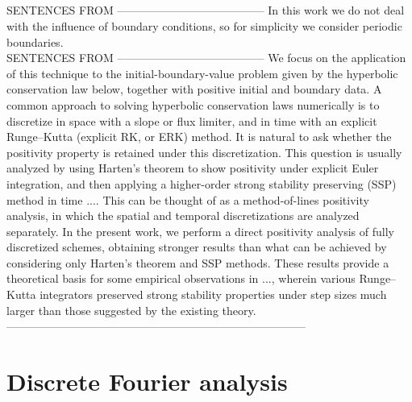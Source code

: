 \documentclass[a4paper]{article}
\begin{document}
\subsection{}
SENTENCES FROM \cite{posconv}---------------------------------------
In this work we do not deal with the influence of boundary conditions, so for simplicity
we consider periodic boundaries.\\
SENTENCES FROM \cite{posconv}---------------------------------------
We focus on the application of this technique to the initial-boundary-value problem given
by the hyperbolic conservation law below, together with positive initial and boundary data.
A common approach to solving hyperbolic conservation laws numerically is to discretize in
space with a slope or flux limiter, and in time with an explicit Runge--Kutta (explicit RK,
or ERK) method. It is natural to ask whether the positivity property is retained under this
discretization. This question is usually analyzed by using Harten's theorem
to show positivity under explicit Euler integration, and then applying a higher-order strong
stability preserving (SSP) method in time .... This can be thought of as a method-of-lines
positivity analysis, in which the spatial and temporal discretizations are analyzed separately.
In the present work, we perform a direct positivity analysis of fully discretized schemes,
obtaining stronger results than what can be achieved by considering only Harten's theorem
and SSP methods. These results provide a theoretical basis for some empirical observations in
..., wherein various Runge--Kutta integrators preserved strong stability properties under
step sizes much larger than those suggested by the existing theory.
--------------------------------------------------------------------------------\\




\section{Discrete Fourier analysis}\label{sectiondiscFourier}
\\
\end{document}

